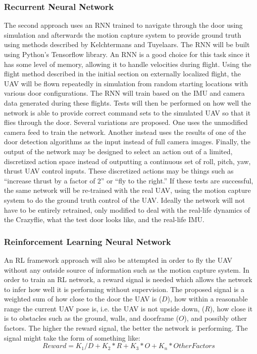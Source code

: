 \documentclass[12pt]{article}
\begin{document}
\subsubsection{Recurrent Neural Network}
The second approach uses an RNN trained to navigate through the door using simulation and afterwards the motion capture system to provide ground truth using methods described by Kelchtermans and Tuyelaars\cite{RNNTraining}. The RNN will be built using Python's Tensorflow library. An RNN is a good choice for this task since it has some level of memory, allowing it to handle velocities during flight. Using the flight method described in the initial section on externally localized flight, the UAV will be flown repeatedly in simulation from random starting locations with various door configurations. The RNN will train based on the IMU and camera data generated during these flights. Tests will then be performed on how well the network is able to provide correct command sets to the simulated UAV so that it flies through the door. Several variations are proposed. One uses the unmodified camera feed to train the network. Another instead uses the results of one of the door detection algorithms as the input instead of full camera images. Finally, the output of the network may be designed to select an action out of a limited, discretized action space instead of outputting a continuous set of roll, pitch, yaw, thrust UAV control inputs. These discretized actions may be things such as ``increase thrust by a factor of 2'' or ``fly to the right.'' If these tests are successful, the same network will be re-trained with the real UAV, using the motion capture system to do the ground truth control of the UAV. Ideally the network will not have to be entirely retrained, only modified to deal with the real-life dynamics of the Crazyflie, what the test door looks like, and the real-life IMU.

\subsubsection{Reinforcement Learning Neural Network}
An RL framework approach will also be attempted in order to fly the UAV without any outside source of information such as the motion capture system. In order to train an RL network, a reward signal is needed which allows the network to infer how well it is performing without supervision. The proposed signal is a weighted sum of how close to the door the UAV is ($D$), how within a reasonable range the current UAV pose is, i.e. the UAV is not upside down, ($R$), how close it is to obstacles such as the ground, walls, and doorframe ($O$), and possibly other factors. The higher the reward signal, the better the network is performing. The signal might take the form of something like:
$$
Reward = K_{1}/D + K_{2}*R + K_{3}*O + K_{n}*OtherFactors
$$
\end{document}
